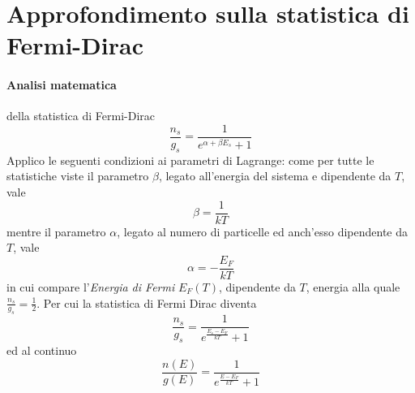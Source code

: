 
\section{Approfondimento sulla statistica di Fermi-Dirac}

\paragraph{Analisi matematica} della statistica di Fermi-Dirac
\begin{equation}
\frac{n_s}{g_s} = \frac{1}{e^{\alpha + \beta E_s} + 1 } 
\end{equation}
Applico le seguenti condizioni ai parametri di Lagrange: 
come per tutte le statistiche viste il parametro $\beta$, legato all'energia del sistema e dipendente da $T$, vale
\begin{equation}
\beta = \frac{ 1}{k T }
\end{equation}
mentre il parametro $\alpha$, legato al numero di particelle ed anch'esso dipendente da $T$, vale
\begin{equation}
\alpha = - \frac{ E_F}{k T }
\end{equation}
in cui compare l'\textit{Energia di Fermi} $E_F(T)$, dipendente da $T$, energia alla quale $\frac{n_s}{g_s}=\frac{1}{2}$.
Per cui la statistica di Fermi Dirac diventa
\begin{equation}
\frac{n_s}{g_s} = \frac{ 1}{e^{ \frac{ E_s - E_F}{k T } } + 1 }
\end{equation}
ed al continuo
\begin{equation}
\frac{n(E)}{g(E)} = \frac{ 1}{e^{ \frac{ E - E_F}{k T } } + 1 }
\end{equation}

